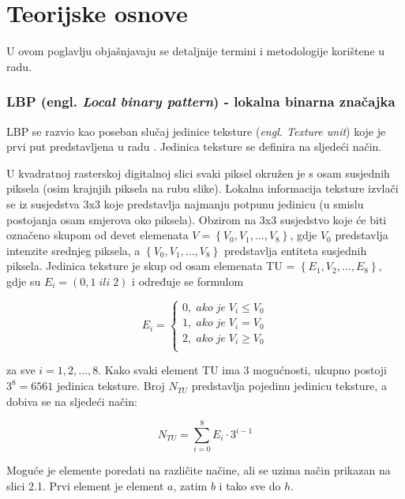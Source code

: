 \documentclass[times, utf8, zavrsni, numeric]{fer}
\begin{document}
\chapter{Teorijske osnove}
U ovom poglavlju objašnjavaju se detaljnije termini i metodologije korištene u radu.

\subsection{LBP (engl. \textit{Local binary pattern}) - lokalna binarna značajka}

LBP se razvio kao poseban slučaj jedinice teksture (\textit{engl. Texture unit})
koje je prvi put predstavljena u radu \citep{dong}.
Jedinica teksture se definira na sljedeći način. 

\bigbreak

U kvadratnoj rasterskoj digitalnoj slici svaki piksel okružen je s
osam susjednih piksela (osim krajnjih piksela na rubu slike). 
Lokalna informacija teksture izvlači se iz susjedstva 3x3 koje 
predstavlja najmanju potpunu jedinicu (u smislu postojanja osam 
smjerova oko piksela). Obzirom na 3x3 susjedstvo koje će biti 
označeno skupom od devet elemenata \(V = \left\{V_0, V_1,..., V_8\right\}\),
gdje \(V_0\) predstavlja intenzite srednjeg piksela, a 
\(\left\{V_0, V_1,..., V_8\right\}\) predstavlja entiteta susjednih piksela.
Jedinica teksture je skup od osam elemenata TU = \(\left\{E_1, V_2,..., E_8\right\}\),
gdje su \(E_i = (0,1\; ili \;2)\) i određuje se formulom

\[
E_i = \left\{
\begin{matrix}
0, \; ako \; je \; V_i \le V_0 \\
1, \; ako \; je \; V_i = V_0 \\
2, \; ako \; je \; V_i \ge V_0 \\
\end{matrix}
\right.
\]

za sve \(i=1,2,...,8\). Kako svaki element TU ima 3 mogućnosti, ukupno
postoji \(3^8 = 6561\) jedinica teksture. Broj \(N_{TU}\) predstavlja 
pojedinu jedinicu teksture, a dobiva se na sljedeći način:

\[
N_{TU} = \sum_{i=0}^{8} E_i \cdot 3^{i-1}
\]

\newpage

Moguće je elemente poredati na različite načine, ali se uzima 
način prikazan na slici 2.1. Prvi element je element \(a\), zatim \(b\) i 
tako sve do \(h\).  

\bigbreak
\end{document}
